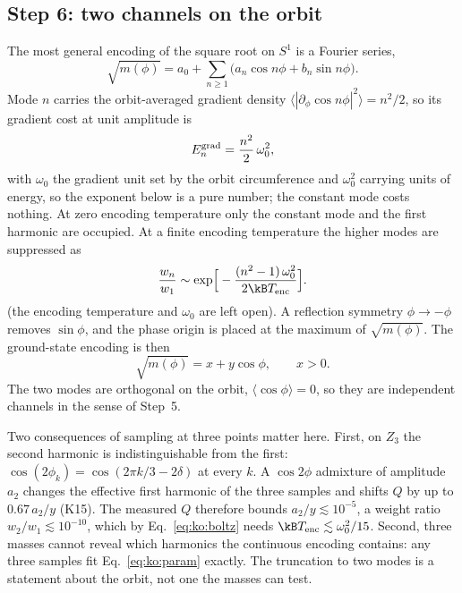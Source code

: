 \subsection{Step 6: two channels on the orbit}
The most general encoding of the square root on $S^1$ is a Fourier series,
\begin{equation}
\sqrt{m(\phi)}=a_0+\sum_{n\ge1}\big(a_n\cos n\phi+b_n\sin n\phi\big).\label{eq:ko:fourier}
\end{equation}
Mode $n$ carries the orbit-averaged gradient density $\langle|\partial_\phi\cos n\phi|^2\rangle=n^2/2$, so its gradient cost at unit amplitude is
\begin{equation}
E^{\rm grad}_n=\frac{n^2}{2}\,\omega_0^2,\label{eq:ko:grad}
\end{equation}
with $\omega_0$ the gradient unit set by the orbit circumference and $\omega_0^2$ carrying units of energy, so the exponent below is a pure number; the constant mode costs nothing. \derived{} At zero encoding temperature only the
constant mode and the first harmonic are occupied. At a finite encoding temperature the higher modes are suppressed as
\begin{equation}
\frac{w_n}{w_1}\sim\exp\!\Big[-\frac{(n^2-1)\,\omega_0^2}{2\kB T_{\rm enc}}\Big].\label{eq:ko:boltz}
\end{equation}
\conjecture{} (the encoding temperature and $\omega_0$ are left open). A reflection symmetry $\phi\to-\phi$ removes $\sin\phi$, and the phase
origin is placed at the maximum of $\sqrt{m(\phi)}$. The ground-state encoding is then
\begin{equation}
\sqrt{m(\phi)}=x+y\cos\phi,\qquad x>0.\label{eq:ko:two}
\end{equation}
\conjecture{} The two modes are orthogonal on the orbit, $\langle\cos\phi\rangle=0$, so they are independent channels in the sense of Step~5.
\derived

Two consequences of sampling at three points matter here. First, on $Z_3$ the second harmonic is indistinguishable from the first:
$\cos(2\phi_k)=\cos(2\pi k/3-2\delta)$ at every $k$. A $\cos2\phi$ admixture of amplitude $a_2$ changes the effective first harmonic of the three
samples and shifts $Q$ by up to $0.67\,a_2/y$ (K15). \calc{} The measured $Q$ therefore bounds $a_2/y\lesssim10^{-5}$, a weight ratio
$w_2/w_1\lesssim10^{-10}$, which by Eq.~\eqref{eq:ko:boltz} needs $\kB T_{\rm enc}\lesssim\omega_0^2/15$. \calc{} Second, three masses cannot
reveal which harmonics the continuous encoding contains: any three samples fit Eq.~\eqref{eq:ko:param} exactly. The truncation to two modes is a
statement about the orbit, not one the masses can test. \derived

